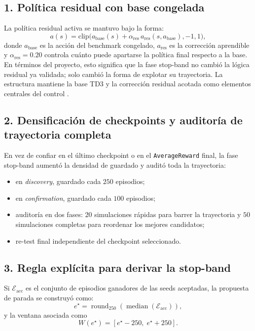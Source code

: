 \documentclass[11pt,a4paper]{article}
\begin{document}
\subsection*{1. Pol\'itica residual con base congelada}
La pol\'itica residual activa se mantuvo bajo la forma:
\begin{equation}
a(s) = \mathrm{clip}\Big(a_{\mathrm{base}}(s) + \alpha_{\mathrm{res}}\,a_{\mathrm{res}}(s,a_{\mathrm{base}}), -1, 1\Big),
\label{eq:residual}
\end{equation}
donde \(a_{\mathrm{base}}\) es la acci\'on del benchmark congelado, \(a_{\mathrm{res}}\) es la correcci\'on aprendible y \(\alpha_{\mathrm{res}} = 0.20\) controla cu\'anto puede apartarse la pol\'itica final respecto a la base. En t\'erminos del proyecto, esto significa que la fase stop-band no cambi\'o la l\'ogica residual ya validada; solo cambi\'o la forma de explotar su trayectoria. La estructura mantiene la base TD3 y la correcci\'on residual acotada como elementos centrales del control \citep{fujimoto2018td3,silver2018residual}.

\subsection*{2. Densificaci\'on de checkpoints y auditor\'ia de trayectoria completa}
En vez de confiar en el \'ultimo checkpoint o en el \texttt{AverageReward} final, la fase stop-band aument\'o la densidad de guardado y audit\'o toda la trayectoria:
\begin{itemize}
\item en \emph{discovery}, guardado cada \(250\) episodios;
\item en \emph{confirmation}, guardado cada \(100\) episodios;
\item auditor\'ia en dos fases: \(20\) simulaciones r\'apidas para barrer la trayectoria y \(50\) simulaciones completas para reordenar los mejores candidatos;
\item re-test final independiente del checkpoint seleccionado.
\end{itemize}

\subsection*{3. Regla expl\'icita para derivar la stop-band}
Si \(\mathcal{E}_{\mathrm{acc}}\) es el conjunto de episodios ganadores de las seeds aceptadas, la propuesta de parada se construy\'o como:
\begin{equation}
e^{\star} = \operatorname{round}_{250}\!\left(\operatorname{median}(\mathcal{E}_{\mathrm{acc}})\right),
\label{eq:stopband_median}
\end{equation}
y la ventana asociada como
\begin{equation}
W(e^{\star}) = [e^{\star}-250,\; e^{\star}+250].
\label{eq:stopband_window}
\end{equation}
\end{document}
